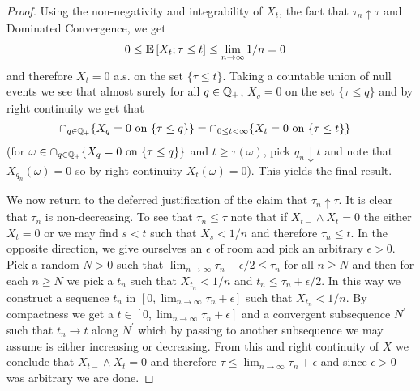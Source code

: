 \begin{proof}
Using the non-negativity and integrability of $X_t$, the fact that $\tau_n \uparrow \tau$ and Dominated Convergence, we get 
\begin{align*}
0 &\leq \textbf{E}\left[ X_t ; \tau \leq t \right] \leq \lim_{n \to \infty} 1/n = 0
\end{align*}
and therefore $X_t = 0$ a.s. on the set $\lbrace \tau \leq t\rbrace$.  Taking a countable union of null events we see that almost surely for all $q \in \mathbb{Q}_+$,  $X_q = 0$ on the set $\lbrace \tau \leq q\rbrace$ and by right continuity we get that 
\begin{align*}
\cap_{q \in \mathbb{Q}_+} \lbrace X_q = 0 \text{ on } \lbrace \tau \leq q \rbrace \rbrace &=
\cap_{0 \leq t < \infty} \lbrace X_t = 0 \text{ on } \lbrace \tau \leq t \rbrace \rbrace
\end{align*}
(for $\omega \in \cap_{q \in \mathbb{Q}_+} \lbrace X_q = 0 \text{ on } \lbrace \tau \leq q \rbrace \rbrace$ and $t \geq \tau(\omega)$, pick $q_n \downarrow t$ and note that $X_{q_n}(\omega) = 0$ so by right continuity $X_t(\omega) = 0$). This yields the final result.

We now return to the deferred justification of the claim that $\tau_n \uparrow \tau$.  It is clear that $\tau_n$ is non-decreasing.  To see that $\tau_n \leq \tau$ note that if $X_{t-} \wedge X_t = 0$ the either $X_t = 0$ or we may find $s < t$ such that $X_s < 1/n$ and therefore $\tau_n \leq t$.  In the opposite direction, we give ourselves an $\epsilon$ of room and pick an arbitrary $\epsilon > 0$.  Pick a random $N > 0$ such that $\lim_{n \to \infty} \tau_n - \epsilon/2 \leq \tau_n$ for all $n \geq N$ and then for each $n \geq N$ we pick a $t_n$ such that $X_{t_n} < 1/n$ and $t_n \leq \tau_n + \epsilon/2$.  In this way we construct a sequence $t_n$ in $[0,\lim_{n \to \infty} \tau_n+\epsilon]$ such that $X_{t_n} < 1/n$.  By compactness we get a $t \in [0,\lim_{n \to \infty} \tau_n+\epsilon]$ and a convergent subsequence $N^\prime$ such that $t_n \to t$ along $N^\prime$  which by passing to another subsequence we may assume is either increasing or decreasing.  From this and right continuity of $X$ we conclude that $X_{t-} \wedge X_t = 0$ and therefore $\tau \leq \lim_{n \to \infty} \tau_n+\epsilon$ and since $\epsilon > 0$ was arbitrary we are done.
\end{proof}

